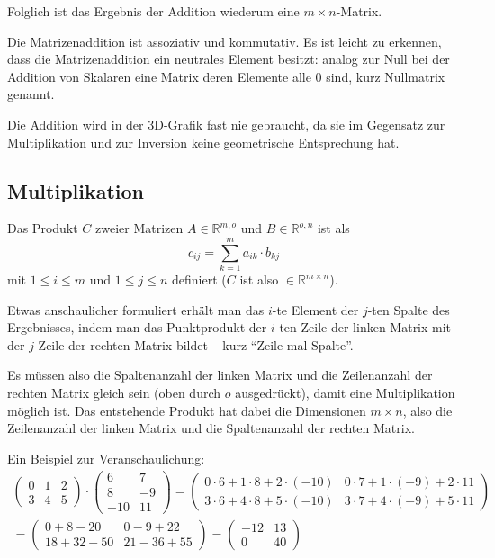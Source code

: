Folglich ist das Ergebnis der Addition wiederum eine $m \times n$-Matrix.

Die Matrizenaddition ist assoziativ und kommutativ. Es ist leicht zu erkennen, dass die Matrizenaddition ein neutrales Element besitzt: analog zur Null bei der Addition von Skalaren eine Matrix deren Elemente alle 0 sind, kurz Nullmatrix genannt.

Die Addition wird in der 3D-Grafik fast nie gebraucht, da sie im Gegensatz zur Multiplikation und zur Inversion keine geometrische Entsprechung hat.

\subsection{Multiplikation}
Das Produkt $C$ zweier Matrizen $A \in \mathbb{R}^{m,o}$ und $B \in \mathbb{R}^{o,n}$ ist als
\begin{equation}
 c_{ij} = \sum_{k=1}^m{a_{ik} \cdot b_{kj}}
\end{equation}
mit $1 \leq i \leq m$ und $1 \leq j \leq n$ definiert ($C$ ist also $\in \mathbb{R}^{m \times n}$).

Etwas anschaulicher formuliert erhält man das $i$-te Element der $j$-ten Spalte des Ergebnisses, indem man das Punktprodukt der $i$-ten Zeile der linken Matrix mit der $j$-Zeile der rechten Matrix bildet -- kurz \enquote{Zeile mal Spalte}.

Es müssen also die Spaltenanzahl der linken Matrix und die Zeilenanzahl der rechten Matrix gleich sein (oben durch $o$ ausgedrückt), damit eine Multiplikation möglich ist. Das entstehende Produkt hat dabei die Dimensionen $m \times n$, also die Zeilenanzahl der linken Matrix und die Spaltenanzahl der rechten Matrix.

Ein Beispiel zur Veranschaulichung:
\begin{equation}
\begin{split}
 \begin{pmatrix}
  0 & 1 & 2 \\
  3 & 4 & 5
 \end{pmatrix}
 \cdot
 \begin{pmatrix}
  6 & 7 \\
  8 & -9 \\
  -10 & 11
 \end{pmatrix}
 =
 \begin{pmatrix}
  0 \cdot 6 + 1 \cdot 8 + 2 \cdot (-10) & 0 \cdot 7 + 1 \cdot (-9) + 2 \cdot 11 \\
  3 \cdot 6 + 4 \cdot 8 + 5 \cdot (-10) & 3 \cdot 7 + 4 \cdot (-9) + 5 \cdot 11
 \end{pmatrix}\\
 =
 \begin{pmatrix}
  0 + 8 - 20 & 0 - 9 + 22 \\
  18 + 32 - 50 & 21 - 36 + 55
 \end{pmatrix}
 =
 \begin{pmatrix}
   -12 & 13 \\
   0 & 40
 \end{pmatrix}
\end{split}
\end{equation}

